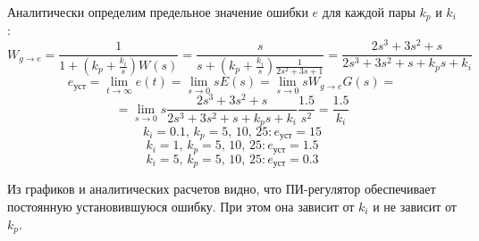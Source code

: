 Аналитически определим предельное значение ошибки $e$ для каждой пары $k_p$ и $k_i$:
\[
    W_{g\to e} = \frac{1}{1 + (k_p+\frac{k_i}{s}) W(s)}
    = \frac{s}{s + (k_p+\frac{k_i}{s}) \frac{1}{2s^2 + 3s + 1}}
    = \frac{2s^3 + 3s^2 + s}{2s^3 + 3s^2 + s + k_p s + k_i}
\]
\[
    e_{\text{уст}} = \lim_{t \to \infty} e(t)
    = \lim_{s \to 0} s E(s)
    = \lim_{s \to 0} s W_{g\to e} G(s) =
\]\[
    = \lim_{s \to 0} s \frac{2s^3 + 3s^2 + s}{2s^3 + 3s^2 + s + k_p s + k_i} \frac{1.5}{s^2}
    = \frac{1.5}{k_i}
\]
\[
    k_i = 0.1, \, k_p = 5,\, 10,\, 25: e_{\text{уст}} = 15
\]
\[
    k_i = 1, \, k_p = 5,\, 10,\, 25: e_{\text{уст}} = 1.5
\]
\[
    k_i = 5, \, k_p = 5,\, 10,\, 25: e_{\text{уст}} = 0.3
\]

Из графиков и аналитических расчетов видно, что ПИ-регулятор 
обеспечивает постоянную установившуюся ошибку. При этом она 
зависит от $k_i$ и не зависит от $k_p$.

